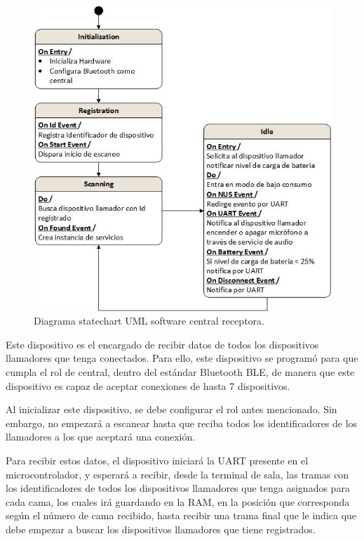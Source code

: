 \begin{figure}[htpb]
	\centering
	\includegraphics[scale=0.8]{./Figures/Dcentral.jpeg}
	\caption{Diagrama statechart UML software central receptora.}
	\label{fig:DiagramaSoftCentral}
\end{figure}

Este dispositivo es el encargado de recibir datos de todos los dispositivos llamadores que tenga conectados. Para ello, este dispositivo se programó para que cumpla el rol de central, dentro del estándar Bluetooth BLE, de manera que este dispositivo es capaz de aceptar conexiones de hasta 7 dispositivos.

Al inicializar este dispositivo, se debe configurar el rol antes mencionado. Sin embargo, no empezará a escanear hasta que reciba todos los identificadores de los llamadores a los que aceptará una conexión.

Para recibir estos datos, el dispositivo iniciará la UART presente en el microcontrolador, y esperará a recibir, desde la terminal de sala, las tramas con los identificadores de todos los dispositivos llamadores que tenga asignados para cada cama, los cuales irá guardando en la RAM, en la posición que corresponda según el número de cama recibido, hasta recibir una trama final que le indica que debe empezar a buscar los dispositivos llamadores que tiene registrados. 

